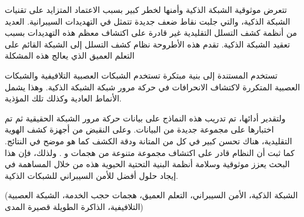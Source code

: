 \begin{abstractAr}





		تتعرض موثوقية الشبكة الذكية وأمنها لخطر كبير بسبب الاعتماد المتزايد على تقنيات الشبكة الذكية، والتي جلبت نقاط ضعف جديدة تتمثل في التهديدات السيبرانية. العديد من أنظمة كشف التسلل التقليدية  غير قادرة على اكتشاف معظم هذه التهديدات بسبب تعقيد الشبكة الذكية. تقدم هذه الأطروحة نظام كشف التسلل إلى الشبكة القائم على التعلم العميق  الذي يعالج هذه المشكلة
		
		  تستخدم  المستندة إلى  بنية مبتكرة تستخدم الشبكات العصبية التلافيفية  والشبكات العصبية المتكررة  لاكتشاف الانحرافات في حركة مرور شبكة الشبكة الذكية. وهذا يشمل الأنماط العادية وكذلك تلك المؤذية.
		
		  ولتقدير أدائها، تم تدريب هذه النماذج على بيانات حركة مرور الشبكة الحقيقية ثم تم اختبارها على مجموعة جديدة من البيانات. وعلى النقيض من أجهزة كشف الهوية التقليدية، هناك تحسن كبير في كل من المتانة ودقة الكشف كما هو موضح في النتائج. كما ثبت أن النظام قادر على اكتشاف مجموعة متنوعة من هجمات  و . ولذلك، فإن هذا البحث يعزز موثوقية وسلامة أنظمة البنية التحتية الحيوية هذه من خلال المساهمة في إيجاد حلول أفضل للأمن السيبراني للشبكات الذكية.
		
		

\end{abstractAr}

\begin{keywordsAr}
	(الشبكة الذكية، الأمن السيبراني، التعلم العميق، هجمات حجب الخدمة، الشبكة العصبية التلافيفية، الذاكرة الطويلة قصيرة المدى)
\end{keywordsAr}

\newpage